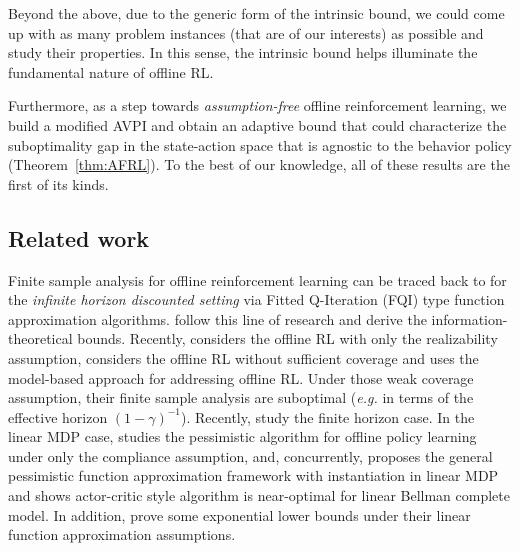Beyond the above, due to the generic form of the intrinsic bound, we could come up with as many problem instances (that are of our interests) as possible and study their properties. In this sense, the intrinsic bound helps illuminate the fundamental nature of offline RL.

Furthermore, as a step towards \emph{assumption-free} offline reinforcement learning, we build a {modified} AVPI and obtain an adaptive bound that could characterize the suboptimality gap in the state-action space that is agnostic to the behavior policy (Theorem~\ref{thm:AFRL}). To the best of our knowledge, all of these results are the first of its kinds. 





\subsection{Related work}
Finite sample analysis for offline reinforcement learning can be traced back to \cite{szepesvari2005finite,antos2008fitted,antos2008learning} for the \emph{infinite horizon discounted setting} via Fitted Q-Iteration (FQI) type function approximation algorithms. \citep{chen2019information,le2019batch,xie2020batch,xie2020q} follow this line of research and derive the information-theoretical bounds. Recently, \cite{xie2020batch} considers the offline RL with only the {realizability} assumption, \cite{liu2020provably,chang2021mitigating} considers the offline RL {without sufficient coverage} and \cite{kidambi2020morel,uehara2021pessimistic} uses the model-based approach for addressing offline RL. Under those weak coverage assumption, their finite sample analysis are suboptimal (\emph{e.g.} in terms of the effective horizon $(1-\gamma)^{-1}$). Recently, \cite{yin2021near,yin2021nearoptimal,ren2021nearly} study the finite horizon case. In the linear MDP case, \cite{jin2020pessimism} studies the pessimistic algorithm for offline policy learning under only the compliance assumption, and, concurrently, \cite{xie2021bellman} proposes the general pessimistic function approximation framework with instantiation in linear MDP and \cite{zanette2021provable} shows actor-critic style algorithm is near-optimal for linear Bellman complete model. In addition, \cite{wang2020statistical,zanette2020exponential} prove some exponential lower bounds under their linear function approximation assumptions.


